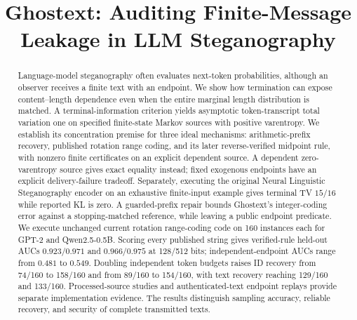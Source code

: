 \documentclass[conference,compsoc]{IEEEtran}
\title{Ghostext: Auditing Finite-Message Leakage in LLM Steganography}
\author{}
\begin{document}
\maketitle

\begin{abstract}
Language-model steganography often evaluates next-token probabilities, although
an observer receives a finite text with an endpoint. We show how termination
can expose content--length dependence even when the entire marginal length
distribution is matched. A terminal-information criterion yields asymptotic
token-transcript total variation one on specified finite-state Markov sources with positive
varentropy. We establish its concentration premise for three ideal mechanisms:
arithmetic-prefix recovery, published rotation range coding, and its later
reverse-verified midpoint rule, with nonzero finite certificates on an explicit
dependent source. A dependent zero-varentropy source gives exact
equality instead; fixed exogenous endpoints have an explicit delivery-failure
tradeoff. Separately, executing the original Neural Linguistic Steganography
encoder on an exhaustive finite-input example gives terminal TV $15/16$ while
reported KL is zero. A guarded-prefix repair bounds Ghostext's integer-coding
error against a stopping-matched reference, while leaving a public endpoint
predicate. We execute unchanged current rotation range-coding code on 160
instances each for GPT-2 and Qwen2.5-0.5B. Scoring every published string gives
verified-rule held-out AUCs $0.923/0.971$ and $0.966/0.975$ at 128/512 bits;
independent-endpoint AUCs range from $0.481$ to $0.549$.
Doubling independent token budgets raises ID recovery from 74/160 to 158/160
and from 89/160 to 154/160, with text recovery reaching 129/160 and 133/160.
Processed-source studies and authenticated-text endpoint
replays provide separate implementation evidence. The results distinguish
sampling accuracy, reliable recovery, and security of complete transmitted texts.
\end{abstract}














\appendices




\end{document}
